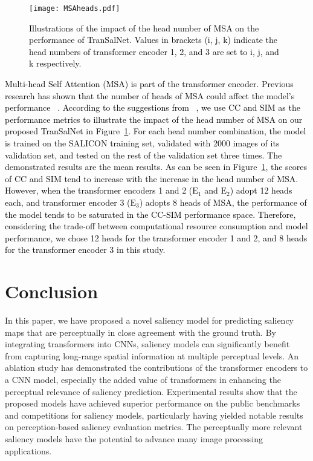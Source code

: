 \documentclass{article}
\begin{document}
\begin{figure}
\centering
\texttt{[image: MSAheads.pdf]}
\caption{\textcolor{black}{Illustrations of the impact of the head number of MSA on the performance of TranSalNet. Values in brackets (i, j, k) indicate the head numbers of transformer encoder 1, 2, and 3 are set to i, j, and k respectively.}}
\label{fig:heads}
\end{figure}

\textcolor{black}{
Multi-head Self Attention (MSA) is part of the transformer encoder. Previous research has shown that the number of heads of MSA could affect the model's performance ~\cite{heads2}. 
According to the suggestions from ~\cite{Bylinskii_2019}, we use CC and SIM as the performance metrics to illustrate the impact of the head number of MSA on our proposed TranSalNet in Figure~\ref{fig:heads}. For each head number combination, the model is trained on the SALICON training set, validated with 2000 images of its validation set, and tested on the rest of the validation set three times. The demonstrated results are the mean results. As can be seen in Figure~\ref{fig:heads}, the scores of CC and SIM tend to increase with the increase in the head number of MSA. However, when the transformer encoders 1 and 2 ($\text{E}_1$ and $\text{E}_2$) adopt 12 heads each, and transformer encoder 3 ($\text{E}_3$) adopts 8 heads of MSA, the performance of the model tends to be saturated in the CC-SIM performance space. Therefore, considering the trade-off between computational resource consumption and model performance, we chose 12 heads for the transformer encoder 1 and 2, and 8 heads for the transformer encoder 3 in this study.
}

\section{Conclusion}


In this paper, we have proposed a novel saliency model for predicting saliency maps that are perceptually in close agreement with the ground truth. By integrating transformers into CNNs, saliency models can significantly benefit from capturing long-range spatial information at multiple perceptual levels. An ablation study has demonstrated the contributions of the transformer encoders to a CNN model, especially the added value of transformers in enhancing the perceptual relevance of saliency prediction. Experimental results show that the proposed models have achieved superior performance on the public benchmarks and competitions for saliency models, particularly having yielded notable results on perception-based saliency evaluation metrics. The perceptually more relevant saliency models have the potential to advance many image processing applications.
\end{document}
